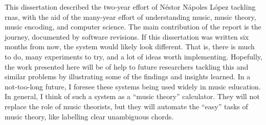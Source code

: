 
This dissertation described the two-year effort of N\'estor
N\'apoles L\'opez tackling \glspl{rna}, with the aid of the
many-year effort of understanding music, music theory, music
encoding, and computer science. The main contribution of the
report is the journey, documented by software revisions. If
this dissertation was written six months from now, the
system would likely look different. That is, there is much
to do, many experiments to try, and a lot of ideas worth
implementing. Hopefully, the work presented here will be of
help to future researchers tackling this and similar
problems by illustrating some of the findings and insights
learned. In a not-too-long future, I foresee these systems
being used widely in music education. In general, I think of
such a system as a ``music theory'' calculator. They will
not replace the role of music theorists, but they will
automate the ``easy'' tasks of music theory, like labelling
clear unambiguous chords. 
